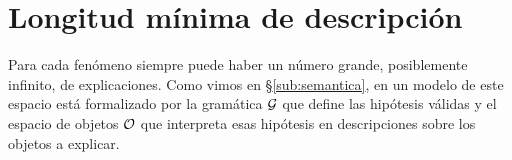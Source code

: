 




\section{Longitud mínima de descripción}


Para cada fenómeno siempre puede haber un número grande, posiblemente infinito, de explicaciones. Como vimos en  \S\ref{sub:semantica}, en un modelo de \lot este espacio está formalizado por la gramática $\gram$ que define las hipótesis válidas y el espacio de objetos $\+O$ que interpreta esas hipótesis en descripciones sobre los objetos a explicar. 

